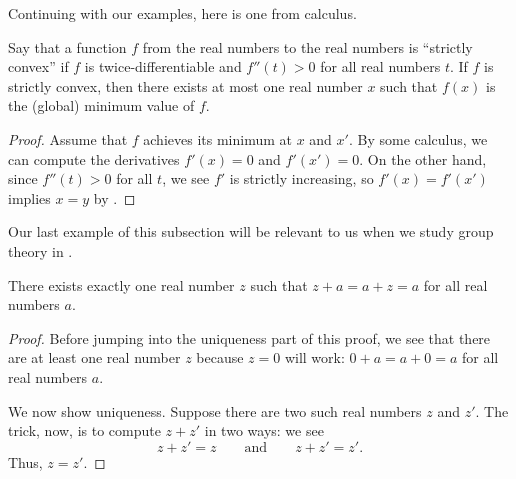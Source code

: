 \documentclass[../main.tex]{subfiles}
\begin{document}
Continuing with our examples, here is one from calculus.
\begin{example}
    Say that a function $f$ from the real numbers to the real numbers is ``strictly convex'' if $f$ is twice-differentiable and $f''(t) > 0$ for all real numbers $t$. If $f$ is strictly convex, then there exists at most one real number $x$ such that $f(x)$ is the (global) minimum value of $f$.
\end{example}
\begin{proof}
    Assume that $f$ achieves its minimum at $x$ and $x'$.
    By some calculus, we can compute the derivatives $f'(x) = 0$ and $f'(x') = 0$. On the other hand, since $f''(t) > 0$ for all $t$, we see $f'$ is strictly increasing, so $f'(x)=f'(x')$ implies $x=y$ by .
\end{proof}
Our last example of this subsection will be relevant to us when we study group theory in .
\begin{example}
    There exists exactly one real number $z$ such that $z+a=a+z=a$ for all real numbers $a$. %
\end{example}
\begin{proof}
    Before jumping into the uniqueness part of this proof, we see that there are at least one real number $z$ because $z=0$ will work: $0+a=a+0=a$ for all real numbers $a$.

    We now show uniqueness. Suppose there are two such real numbers $z$ and $z'$. The trick, now, is to compute $z+z'$ in two ways: we see
    \[z+z'=z\qquad\text{and}\qquad z+z'=z'.\]
    Thus, $z=z'$.
\end{proof}
\end{document}
